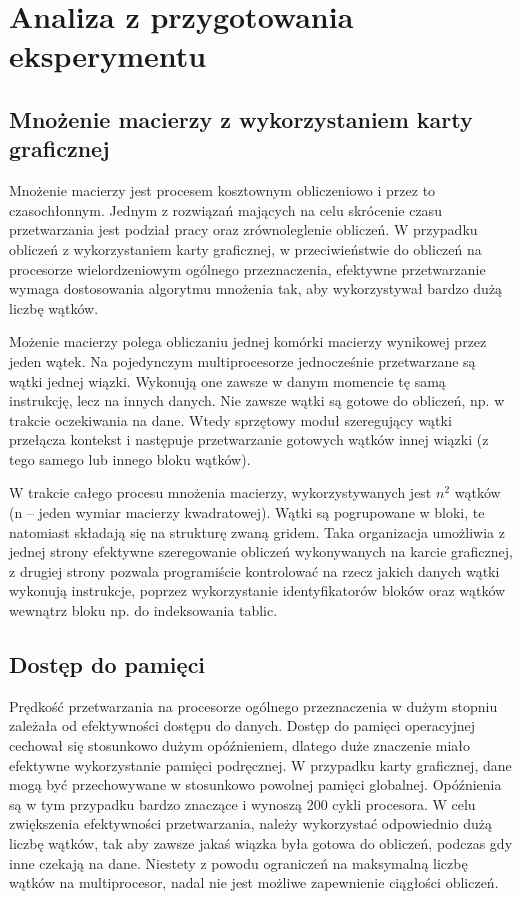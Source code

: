 \documentclass[12pt,a4paper]{article}
\begin{document}
\section{Analiza z przygotowania eksperymentu}

\subsection{Mnożenie macierzy z wykorzystaniem karty graficznej}

Mnożenie macierzy jest procesem kosztownym obliczeniowo i przez to czasochłonnym. Jednym z rozwiązań mających na celu skrócenie czasu przetwarzania jest podział pracy oraz zrównoleglenie obliczeń. W przypadku obliczeń z wykorzystaniem karty graficznej, w przeciwieństwie do obliczeń na procesorze wielordzeniowym ogólnego przeznaczenia, efektywne przetwarzanie wymaga dostosowania algorytmu mnożenia tak, aby wykorzystywał bardzo dużą liczbę wątków.

Możenie macierzy polega obliczaniu jednej komórki macierzy wynikowej przez jeden wątek. Na pojedynczym multiprocesorze jednocześnie przetwarzane są wątki jednej wiązki. Wykonują one zawsze w danym momencie tę samą instrukcję, lecz na innych danych. Nie zawsze wątki są gotowe do obliczeń, np. w trakcie oczekiwania na dane. Wtedy sprzętowy moduł szeregujący wątki przełącza kontekst i następuje przetwarzanie gotowych wątków innej wiązki (z tego samego lub innego bloku wątków).

W trakcie całego procesu mnożenia macierzy, wykorzystywanych jest $n^2$ wątków (n -- jeden wymiar macierzy kwadratowej). Wątki są pogrupowane w bloki, te natomiast składają się na strukturę zwaną gridem. Taka organizacja umożliwia z jednej strony efektywne szeregowanie obliczeń wykonywanych na karcie graficznej, z drugiej strony pozwala programiście kontrolować na rzecz jakich danych wątki wykonują instrukcje, poprzez wykorzystanie identyfikatorów bloków oraz wątków wewnątrz bloku np. do indeksowania tablic.

\subsection{Dostęp do pamięci}

Prędkość przetwarzania na procesorze ogólnego przeznaczenia w dużym stopniu zależała od efektywności dostępu do danych. Dostęp do pamięci operacyjnej cechował się stosunkowo dużym opóźnieniem, dlatego duże znaczenie miało efektywne wykorzystanie pamięci podręcznej.
W przypadku karty graficznej, dane mogą być przechowywane w stosunkowo powolnej pamięci globalnej. Opóźnienia są w tym przypadku bardzo znaczące i wynoszą 200 cykli procesora. W celu zwiększenia efektywności przetwarzania, należy wykorzystać odpowiednio dużą liczbę wątków, tak aby zawsze jakaś wiązka była gotowa do obliczeń, podczas gdy inne czekają na dane. Niestety z powodu ograniczeń na maksymalną liczbę wątków na multiprocesor, nadal nie jest możliwe zapewnienie ciągłości obliczeń.
\end{document}

